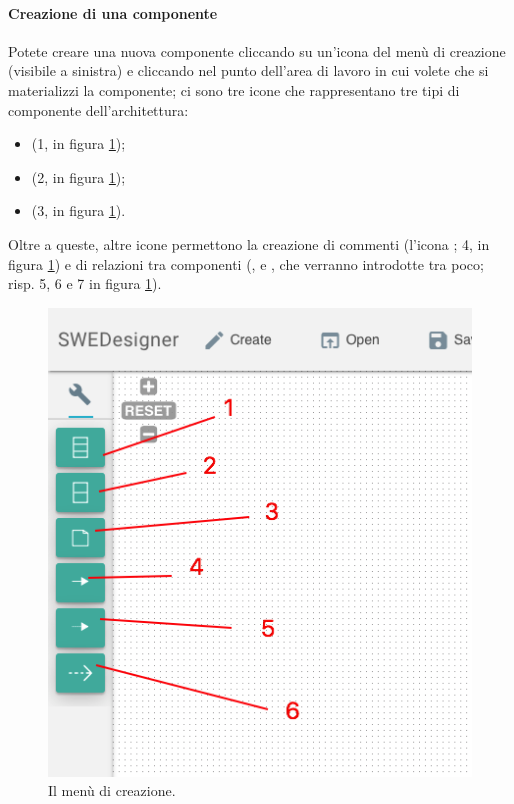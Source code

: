 \paragraph{Creazione di una componente} \label{par:creaz_class} Potete creare una nuova componente cliccando su un'icona del menù di creazione (visibile a sinistra) e cliccando nel punto dell'area di lavoro in cui volete che si materializzi la componente; ci sono tre icone che rappresentano tre tipi di componente dell'architettura:
\begin{itemize}
	\item {} (1, in figura \ref{fig:creation});
	\item {} (2, in figura \ref{fig:creation});
	\item {} (3, in figura \ref{fig:creation}).
\end{itemize}
Oltre a queste, altre icone permettono la creazione di commenti (l'icona ; 4, in figura \ref{fig:creation}) e di relazioni tra componenti (,  e , che verranno introdotte tra poco; risp. 5, 6 e 7 in figura \ref{fig:creation}).

\begin{figure}[h]
\centering
	\includegraphics[scale=0.4]{img/creation}
	\caption{Il menù di creazione.}
	\label{fig:creation}
\end{figure}

